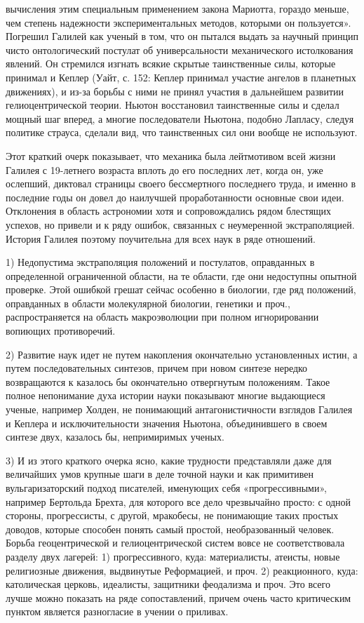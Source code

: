 вычисления  этим  специальным  применением  закона  Мариотта,  гораздо
меньше, чем степень надежности  экспериментальных методов, которыми он
пользуется». Погрешил Галилей как ученый  в том, что он пытался выдать
за научный  принцип чисто  онтологический постулат  об универсальности
механического  истолкования  явлений.   Он  стремился  изгнать  всякие
скрытые таинственные  силы, которые принимал  и Кеплер (Уайт,  с. 152:
Кеплер принимал участие ангелов в планетных движениях), и из-за борьбы
с  ними  не принял  участия  в  дальнейшем развитии  гелиоцентрической
теории.  Ньютон  восстановил таинственные  силы  и  сделал мощный  шаг
вперед,  а  многие  последователи  Ньютона,  подобно  Лапласу,  следуя
политике  страуса, сделали  вид, что  таинственных сил  они вообще  не
используют.

Этот  краткий очерк  показывает,  что механика  была лейтмотивом  всей
жизни Галилея с 19-летнего возраста вплоть до его последних лет, когда
он,  уже ослепший,  диктовал страницы  своего бессмертного  последнего
труда, и именно в последние годы он довел до наилучшей проработанности
основные   свои  идеи.   Отклонения  в   область  астрономии   хотя  и
сопровождались рядом  блестящих успехов, но  привели и к  ряду ошибок,
связанных  с  неумеренной   экстраполяцией.  История  Галилея  поэтому
поучительна для всех наук в ряде отношений.

1)  Недопустима экстраполяция  положений и  постулатов, оправданных  в
определенной ограниченной  области, на те области,  где они недоступны
опытной  проверке. Этой  ошибкой  грешат сейчас  особенно в  биологии,
где  ряд  положений,  оправданных  в  области  молекулярной  биологии,
генетики и проч., распространяется на область макроэволюции при полном
игнорировании вопиющих противоречий.

2)   Развитие    наук   идет   не   путем    накопления   окончательно
установленных  истин, а  путем последовательных  синтезов, причем  при
новом  синтезе   нередко  возвращаются  к  казалось   бы  окончательно
отвергнутым положениям.  Такое полное  непонимание духа  истории науки
показывают многие  выдающиеся ученые,  например Холден,  не понимающий
антагонистичности  взглядов  Галилея   и  Кеплера  и  исключительности
значения  Ньютона, объединившего  в своем  синтезе двух,  казалось бы,
непримиримых ученых.

3) И из этого краткого  очерка ясно, какие трудности представляли даже
для величайших умов крупные шаги в  деле точной науки и как примитивен
вульгаризаторский подход  писателей, именующих  себя «прогрессивными»,
например Бертольда Брехта, для которого все дело чрезвычайно просто: с
одной стороны, прогрессисты, с  другой, мракобесы, не понимающие таких
простых доводов, которые способен понять самый простой, необразованный
человек.  Борьба  геоцентрической  и  гелиоцентрической  систем  вовсе
не  соответствовала разделу  двух  лагерей:  1) прогрессивного,  куда:
материалисты,   атеисты,   новые  религиозные   движения,   выдвинутые
Реформацией,  и проч.  2)  реакционного,  куда: католическая  церковь,
идеалисты, защитники феодализма и проч. Это всего лучше можно показать
на ряде сопоставлений, причем очень часто критическим пунктом является
разногласие в учении о приливах.


